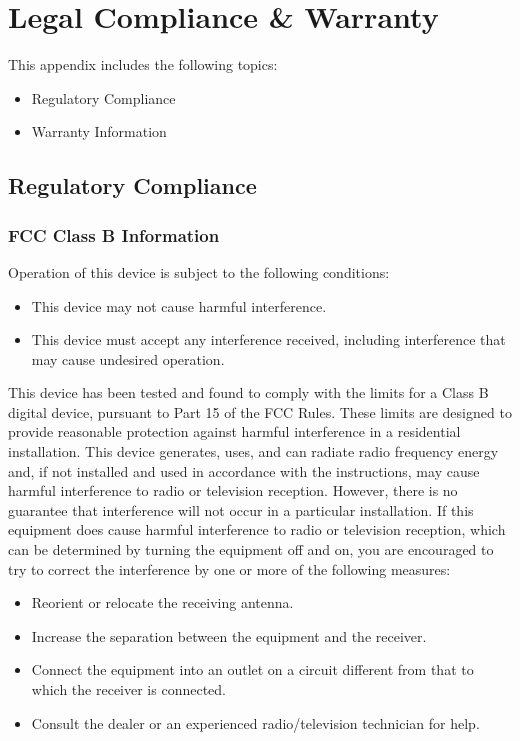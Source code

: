 \documentclass[letterpaper,10pt,english]{sphinxmanual}
\begin{document}
\chapter{Legal Compliance \& Warranty}
\label{\detokenize{warranty:legal-compliance-warranty}}\label{\detokenize{warranty::doc}}
This appendix includes the following topics:
\begin{itemize}
\item {} 
Regulatory Compliance

\item {} 
Warranty Information

\end{itemize}


\section{Regulatory Compliance}
\label{\detokenize{warranty:regulatory-compliance}}

\subsection{FCC Class B Information}
\label{\detokenize{warranty:fcc-class-b-information}}
Operation of this device is subject to the following conditions:
\begin{itemize}
\item {} 
This device may not cause harmful interference.

\item {} 
This device must accept any interference received, including interference that may cause undesired operation.

\end{itemize}

This device has been tested and found to comply with the limits for a Class B digital device, pursuant to Part 15 of the FCC Rules. These limits are designed to provide reasonable protection against harmful interference in a residential installation. This device generates, uses, and can radiate radio frequency energy and, if not installed and used in accordance with the instructions, may cause harmful interference to radio or television reception. However, there is no guarantee that interference will not occur in a particular installation. If this equipment does cause harmful interference to radio or television reception, which can be determined by turning the equipment off and on, you are encouraged to try to correct the interference by one or more of the following measures:
\begin{itemize}
\item {} 
Reorient or relocate the receiving antenna.

\item {} 
Increase the separation between the equipment and the receiver.

\item {} 
Connect the equipment into an outlet on a circuit different from that to which the receiver is connected.

\item {} 
Consult the dealer or an experienced radio/television technician for help.

\end{itemize}
\end{document}
